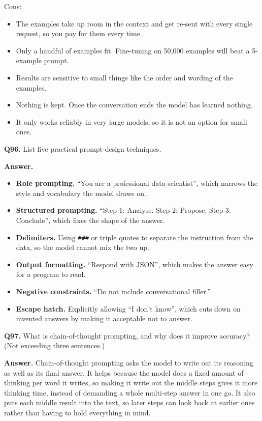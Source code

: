 \documentclass[11pt]{article}
\begin{document}
Cons:
\begin{itemize}
  \item The examples take up room in the context and get re-sent with every single request, so you pay for them every time.
  \item Only a handful of examples fit. Fine-tuning on 50{,}000 examples will beat a 5-example prompt.
  \item Results are sensitive to small things like the order and wording of the examples.
  \item Nothing is kept. Once the conversation ends the model has learned nothing.
  \item It only works reliably in very large models, so it is not an option for small ones.
\end{itemize}

\medskip
\textbf{Q96.} List five practical prompt-design techniques.

\textbf{Answer.}
\begin{itemize}
  \item \textbf{Role prompting.} ``You are a professional data scientist'', which narrows the style and vocabulary the model draws on.
  \item \textbf{Structured prompting.} ``Step 1: Analyse. Step 2: Propose. Step 3: Conclude'', which fixes the shape of the answer.
  \item \textbf{Delimiters.} Using \verb|###| or triple quotes to separate the instruction from the data, so the model cannot mix the two up.
  \item \textbf{Output formatting.} ``Respond with JSON'', which makes the answer easy for a program to read.
  \item \textbf{Negative constraints.} ``Do not include conversational filler.''
  \item \textbf{Escape hatch.} Explicitly allowing ``I don't know'', which cuts down on invented answers by making it acceptable not to answer.
\end{itemize}

\medskip
\textbf{Q97.} What is chain-of-thought prompting, and why does it improve accuracy? (Not
exceeding three sentences.)

\textbf{Answer.} Chain-of-thought prompting asks the model to write out its reasoning as well
as its final answer. It helps because the model does a fixed amount of thinking per word it
writes, so making it write out the middle steps gives it more thinking time, instead of
demanding a whole multi-step answer in one go. It also puts each middle result into the text,
so later steps can look back at earlier ones rather than having to hold everything in mind.
\end{document}
